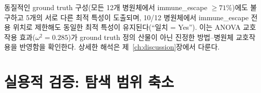 \begin{table}[htbp]
\centering
\caption{12개 병원체에 걸친 ground truth 이질성 분석. 모든 병원체에서 immune\_escape 태그 위치가 다수를 차지하지만, 최적 판별 특성은 병원체마다 다르다. ``일치''는 immune\_escape 전용 위치로 제한했을 때 최적 특성이 동일하게 유지되는지를 나타낸다.}
\label{tab:gt_heterogeneity}
\end{table}

동질적인 ground truth 구성(모든 12개 병원체에서 immune\_escape $\geq 71\%$)에도 불구하고 5개의 서로 다른 최적 특성이 도출되며, 10/12 병원체에서 immune\_escape 전용 위치로 제한해도 동일한 최적 특성이 유지된다(``일치 = Yes'').
이는 ANOVA 교호작용 효과($\omega^2 = 0.285$)가 ground truth 정의 산물이 아닌 진정한 방법--병원체 교호작용을 반영함을 확인한다. 상세한 해석은 제~\ref{ch:discussion}장에서 다룬다.

\section{실용적 검증: 탐색 범위 축소}
\label{sec:adapt_practical}

